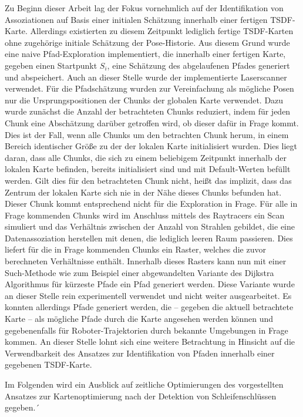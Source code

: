 Zu Beginn dieser Arbeit lag der Fokus vornehmlich auf der Identifikation von Assoziationen auf Basis einer initialen Schätzung innerhalb einer fertigen TSDF-Karte. Allerdings existierten zu diesem Zeitpunkt lediglich fertige TSDF-Karten ohne zugehörige initiale Schätzung der Pose-Historie. Aus diesem Grund wurde eine naive Pfad-Exploration implementiert, die innerhalb einer fertigen Karte, gegeben einen Startpunkt $S_i$, eine Schätzung des abgelaufenen Pfades generiert und abspeichert. Auch an dieser Stelle wurde der implementierte Laserscanner verwendet. Für die Pfadschätzung wurden zur Vereinfachung als mögliche Posen nur die Ursprungspositionen der Chunks der globalen Karte verwendet. Dazu wurde zunächst die Anzahl der betrachteten Chunks reduziert, indem für jeden Chunk eine Abschätzung darüber getroffen wird, ob dieser dafür in Frage kommt. Dies ist der Fall, wenn alle Chunks um den betrachten Chunk herum, in einem Bereich identischer Größe zu der der lokalen Karte initialisiert wurden. Dies liegt daran, dass alle Chunks, die sich zu einem beliebigem Zeitpunkt innerhalb der lokalen Karte befinden, bereits initialisiert sind und mit Default-Werten befüllt werden. Gilt dies für den betrachteten Chunk nicht, heißt das implizit, dass das Zentrum der lokalen Karte sich nie in der Nähe dieses Chunks befunden hat. Dieser Chunk kommt entsprechend nicht für die Exploration in Frage. Für alle in Frage kommenden Chunks wird im Anschluss mittels des Raytracers ein Scan simuliert und das Verhältnis zwischen der Anzahl von Strahlen gebildet, die eine Datenassoziation herstellen mit denen, die lediglich leeren Raum passieren. Dies liefert für die in Frage kommenden Chunks ein Raster, welches die zuvor berechneten Verhältnisse enthält. Innerhalb dieses Rasters kann nun mit einer Such-Methode wie zum Beispiel einer abgewandelten Variante des Dijkstra Algorithmus für kürzeste Pfade \cite{noto2000method} ein Pfad generiert werden. Diese Variante wurde an dieser Stelle rein experimentell verwendet und nicht weiter ausgearbeitet. Es konnten allerdings Pfade generiert werden, die -- gegeben die aktuell betrachtete Karte -- als mögliche Pfade durch die Karte angesehen werden können und gegebenenfalls für Roboter-Trajektorien durch bekannte Umgebungen in Frage kommen. An dieser Stelle lohnt sich eine weitere Betrachtung in Hinsicht auf die Verwendbarkeit des Ansatzes zur Identifikation von Pfaden innerhalb einer gegebenen TSDF-Karte.

Im Folgenden wird ein Ausblick auf zeitliche Optimierungen des vorgestellten Ansatzes zur Kartenoptimierung nach der Detektion von Schleifenschlüssen gegeben.´

